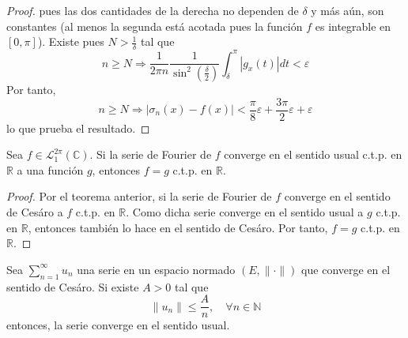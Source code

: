 \documentclass[12pt]{report}
\theoremstyle{largebreak}
\newcommand\abs[1]{\ensuremath{\left|#1\right|}}
\newcommand\norm[1]{\ensuremath{\|#1\|}}
\begin{document}
\begin{proof}
        pues las dos cantidades de la derecha no dependen de $\delta$ y más aún, son constantes (al menos la segunda está acotada pues la función $f$ es integrable en $[0,\pi]$). Existe pues $N>\frac{1}{\delta}$ tal que
        \begin{equation*}
            n\geq N\Rightarrow\frac{1}{2\pi n}\frac{1}{\sin^2\left(\frac{\delta}{2} \right)}\int_\delta^{\pi}\abs{g_x(t)}dt<\varepsilon
        \end{equation*}
        Por tanto,
        \begin{equation*}
            n\geq N\Rightarrow\abs{\sigma_n(x)-f(x)}<\frac{\pi}{8}\varepsilon+\frac{3\pi}{2}\varepsilon+\varepsilon
        \end{equation*}
        lo que prueba el resultado.
    \end{proof}

    \begin{cor}
        Sea $f\in\mathcal{L}_1^{2\pi}(\mathbb{C})$. Si la serie de Fourier de $f$ converge en el sentido usual c.t.p. en $\mathbb{R}$ a una función $g$, entonces $f=g$ c.t.p. en $\mathbb{R}$.
    \end{cor}

    \begin{proof}
        Por el teorema anterior, si la serie de Fourier de $f$ converge en el sentido de Cesáro a $f$ c.t.p. en $\mathbb{R}$. Como dicha serie converge en el sentido usual a $g$ c.t.p. en $\mathbb{R}$, entonces también lo hace en el sentido de Cesáro. Por tanto, $f=g$ c.t.p. en $\mathbb{R}$.
    \end{proof}
    
    \begin{theor}
        Sea $\sum_{ n=1}^\infty u_n$ una serie en un espacio normado $(E,\norm{\cdot})$ que converge en el sentido de Cesáro. Si existe $A>0$ tal que
        \begin{equation*}
            \norm{u_n}\leq\frac{A}{n},\quad\forall n\in\mathbb{N}
        \end{equation*}
        entonces, la serie converge en el sentido usual.
    \end{theor}
\end{document}
